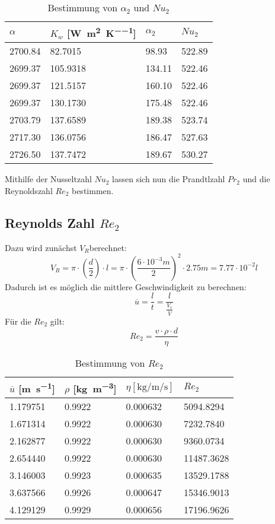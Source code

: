\documentclass[12pt]{article}
\begin{document}
 \begin{table}[ht!]
  \centering
 \begin{tabularx}{\textwidth}{XXXX}
 $\alpha$ &  $K _w$ [\si{\watt\per\square\meter\per\kelvin}] & $ \alpha _2$ & $Nu _2 $  \\
\hline

2700.84 & 82.7015  & 98.93  & 522.89 \\
2699.37 & 105.9318 & 134.11 & 522.46 \\
2699.37 & 121.5157 & 160.10 & 522.46 \\
2699.37 & 130.1730 & 175.48 & 522.46 \\
2703.79 & 137.6589 & 189.38 & 523.74 \\
2717.30 & 136.0756 & 186.47 & 527.63 \\
2726.50 & 137.7472 & 189.67 & 530.27 \\
\end{tabularx}
  \caption{Bestimmung von $\alpha _2$ und $Nu _2$}
\end{table}
Mithilfe der Nusseltzahl $Nu_2$ lassen sich nun die Prandtlzahl $Pr _2$
und die Reynoldszahl $Re _2$ bestimmen.
\subsection{Reynolds Zahl $Re _2$}
Dazu wird zunächst $V _R$berechnet:
\begin{equation}
  V _R = \pi \cdot (\frac{d}{2}) \cdot l = \pi \cdot (\frac{6 \cdot 10^{-3} m}{2})^2 \cdot 2.75 m = 7.77 \cdot 10 ^{-2} l
\end{equation}
Dadurch ist es möglich die mittlere Geschwindigkeit zu berechnen:
\begin{equation}
  \overline{u} = \frac{l}{t} = \frac{l}{\frac{V_r}{\dot V}}
\end{equation}
Für die $Re_2$ gilt:
\begin{equation}
  Re _2 = \frac{v \cdot \rho \cdot d}{\eta}
\end{equation}
 \begin{table}[ht!]
  \centering
 \begin{tabularx}{\textwidth}{XXXX}
 $\overline u$ [\si{\meter\per\second}]  &  $\rho$ [\si{\kilo\gram\per\cubic\meter}] &
 $ \eta [\si{\kilo\gram\per\meter\per\second}] $ & $Re _2 $  \\
\hline

1.179751 & 0.9922 & 0.000632 &5094.8294 \\
1.671314 & 0.9922 & 0.000630 &7232.7840 \\

2.162877 & 0.9922 & 0.000630 &9360.0734 \\
2.654440 & 0.9922 & 0.000630 &11487.3628\\

3.146003 & 0.9923 & 0.000635 &13529.1788\\
3.637566 & 0.9926 & 0.000647 &15346.9013\\

4.129129 & 0.9929 & 0.000656 &17196.9626\\
\end{tabularx}
  \caption{Bestimmung von $Re _2$}
\end{table}
\end{document}
